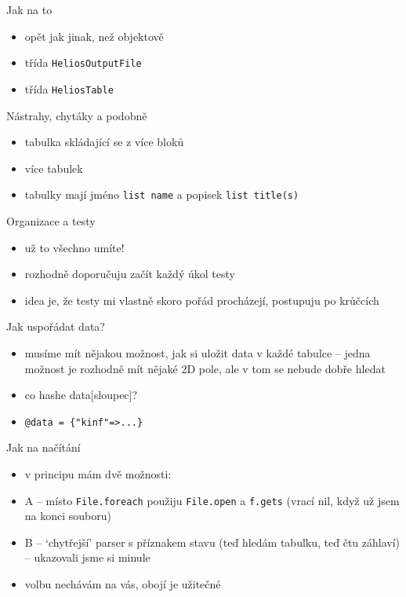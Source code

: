 \documentclass{beamer}
\begin{document}
\begin{frame}{Jak na to}
  \begin{itemize}
    \item opět jak jinak, než objektově
    \item třída \texttt{HeliosOutputFile}
    \item třída \texttt{HeliosTable}  
  \end{itemize}
\end{frame}

\begin{frame}{Nástrahy, chytáky a podobně}
  \begin{itemize}
    \item tabulka skládající se z více bloků
    \item více tabulek
    \item tabulky mají jméno \texttt{list name} a popisek \texttt{list title(s)}
  \end{itemize}
\end{frame}

\begin{frame}{Organizace a testy}
  \begin{itemize}
    \item už to všechno umíte!
    \item rozhodně doporučuju začít každý úkol testy 
    \item idea je, že testy mi vlastně skoro pořád procházejí, postupuju po krůčcích 
  \end{itemize}
\end{frame}

\begin{frame}[fragile]{Jak uspořádat data?}
  \begin{itemize}
    \item musíme mít nějakou možnost, jak si uložit data v každé tabulce -- jedna možnost je rozhodně mít nějaké 2D pole, ale v tom se nebude dobře hledat
    \pause
    \item co hashe data[sloupec]?
    \pause
    \item \verb!@data = {"kinf"=>...}!
  \end{itemize}
\end{frame}

\begin{frame}{Jak na načítání}
  \begin{itemize}
    \item v principu mám dvě možnosti:
    \item A -- místo \texttt{File.foreach} použiju \texttt{File.open} a \texttt{f.gets} (vrací nil, když už jsem na konci souboru)
    \item B -- `chytřejší' parser s příznakem stavu (teď hledám tabulku, teď čtu záhlaví) -- ukazovali jsme si minule
    \item volbu nechávám na vás, obojí je užitečné
  \end{itemize}
\end{frame}
\end{document}
